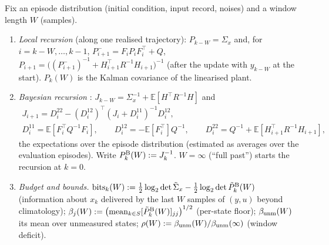\begin{definition}\label{def:m4-budget}
Fix an episode distribution (initial condition, input record, noises) and a window length $W$ (samples).
\begin{enumerate}
\item[(i)] \emph{Local recursion} (along one realised trajectory): $P_{k-W}=\Sigma_x$ and, for $i=k-W,\dots,k-1$,
$P^-_{i+1}=F_iP_iF_i^\top+Q$, $P_{i+1}=\big((P^-_{i+1})^{-1}+H_{i+1}^\top R^{-1}H_{i+1}\big)^{-1}$ (after the update
with $y_{k-W}$ at the start). $P_k(W)$ is the Kalman covariance of the linearised plant.
\item[(ii)] \emph{Bayesian recursion} \citep{tichavsky1998posterior}: $J_{k-W}=\Sigma_x^{-1}+\mathbb E[H^\top R^{-1}H]$
and
\begin{gather*}
J_{i+1}=D^{22}_i-(D^{12}_i)^\top(J_i+D^{11}_i)^{-1}D^{12}_i,\\
D^{11}_i=\mathbb E[F_i^\top Q^{-1}F_i],\qquad D^{12}_i=-\mathbb E[F_i^\top]Q^{-1},\qquad D^{22}_i=Q^{-1}+\mathbb E[H_{i+1}^\top R^{-1}H_{i+1}],
\end{gather*}
the expectations over the episode distribution (estimated as averages over the evaluation episodes). Write
$P^{\rm B}_k(W):=J_k^{-1}$. $W=\infty$ (``full past'') starts the recursion at $k=0$.
\item[(iii)] \emph{Budget and bounds.} $\mathrm{bits}_k(W):=\tfrac12\log_2\det\tilde\Sigma_x-\tfrac12\log_2\det\tilde P^{\rm B}_k(W)$
(information about $x_k$ delivered by the last $W$ samples of $(y,u)$ beyond climatology);
$\beta_j(W):=\big(\mathrm{mean}_{k\in S}[\tilde P^{\rm B}_k(W)]_{jj}\big)^{1/2}$ (per-state floor);
$\beta_{\rm unm}(W)$ its mean over unmeasured states; $\rho(W):=\beta_{\rm unm}(W)/\beta_{\rm unm}(\infty)$ (window deficit).
\end{enumerate}
\end{definition}

